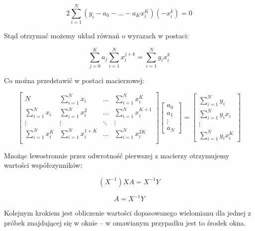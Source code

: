 \documentclass[a4paper]{article}
\begin{document}
\begin{equation}
2\sum_{i=1}^N \left( y_i - a_0 - ... - a_K x_i^K \right) (- x_i^k) = 0
\end{equation}

Stąd otrzymać możemy układ równań o wyrazach w postaci:

\begin{equation} \label{normal_equations_for_ls}
\sum_{j=0}^K a_j \sum_{i=1}^N x_i^{j+k} = \sum_{i=1}^N y_i x_i^k
\end{equation}

Co można przedstawić w postaci macierzowej:

\begin{equation} \label{matrices}
\begin{bmatrix}
    N      & \sum_{i=1}^N x_i & \dots & \sum_{i=1}^N x_i^{K} \\
    \sum_{i=1}^N x_i      & \sum_{i=1}^N x_i^2 & \dots & \sum_{i=1}^N x_i^{K+1} \\
    \vdots & \vdots & \ddots & \vdots \\
\sum_{i=1}^N x_i^K      & \sum_{i=1}^N x_i^{1+K} & \dots & \sum_{i=1}^N x_i^{2K}\\
\end{bmatrix}
\begin{bmatrix}
    a_0	\\
    a_1	\\
    \vdots	\\
    a_N
\end{bmatrix}
=
\begin{bmatrix}
    \sum_{i=1}^N y_i	\\
    \sum_{i=1}^N y_i x_i	\\
    \vdots	\\
    \sum_{i=1}^N y_i x_i^K
\end{bmatrix}
\end{equation}

Mnożąc lewostronnie przez odwrotność pierwszej z macierzy otrzymujemy wartości współczynników:

\begin{equation}
(X^{-1}) X A = X^{-1}Y
\end{equation}

\begin{equation}
A = X^{-1}Y
\end{equation}

Kolejnym krokiem jest obliczenie wartości dopasowanego wielomianu dla jednej z próbek znajdującej się w oknie -- w omawianym przypadku jest to środek okna.
\end{document}
